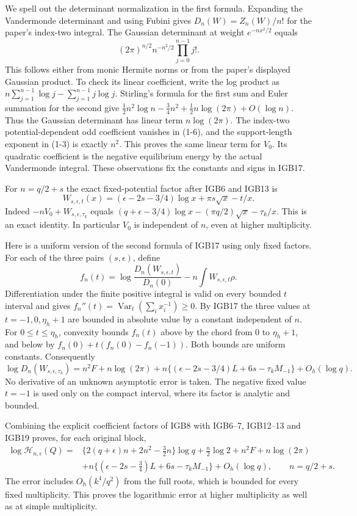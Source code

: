 We spell out the determinant normalization in the first formula.
Expanding the Vandermonde determinant and using Fubini gives
$D_n(W)=Z_n(W)/n!$ for the paper's index-two integral.
The Gaussian determinant at weight $e^{-nx^2/2}$ equals
\[
 (2\pi)^{n/2}n^{-n^2/2}\prod_{j=0}^{n-1}j!.
\]
This follows either from monic Hermite norms or from the paper's
displayed Gaussian product. To check its linear coefficient,
write the log product as
$n\sum_{j=1}^{n-1}\log j-\sum_{j=1}^{n-1}j\log j$.
Stirling's formula for the first sum and Euler summation for
the second give
$\tfrac12n^2\log n-\tfrac34n^2+
\tfrac12n\log(2\pi)+O(\log n)$.
Thus the Gaussian determinant has linear term $n\log(2\pi)$.
The index-two potential-dependent odd coefficient vanishes
in (1-6), and the support-length exponent in (1-3) is exactly
$n^2$. This proves the same linear term for $V_0$.
Its quadratic coefficient is the negative equilibrium energy
by the actual Vandermonde integral. These observations fix
the constants and signs in IGB17.

For $n=q/2+s$ the exact fixed-potential factor after IGB6 and
IGB13 is
\[
 W_{s,\epsilon,t}(x)=
 (\epsilon-2s-3/4)\log x+\pi s\sqrt{x}-t/x .
 \tag{IGB18}
\]
Indeed $-nV_0+W_{s,\epsilon,\tau_k}$ equals
$(q+\epsilon-3/4)\log x-(\pi q/2)\sqrt{x}-\tau_k/x$.
This is an exact identity. In particular $V_0$ is independent
of $n$, even at higher multiplicity.

Here is a uniform version of the second formula of IGB17 using only
fixed factors. For each of the three pairs $(s,\epsilon)$, define
\[
 f_n(t)=\log\frac{D_n(W_{s,\epsilon,t})}{D_n(0)}
                  -n\int W_{s,\epsilon,t}\rho .
\]
Differentiation under the finite positive integral is valid on
every bounded $t$ interval and gives
$f_n''(t)=\operatorname{Var}_t(\sum_i x_i^{-1})\geq0$.
By IGB17 the three values at $t=-1,0,\eta_h+1$ are bounded
in absolute value by a constant independent of $n$.
For $0\leq t\leq\eta_h$, convexity bounds $f_n(t)$ above by
the chord from $0$ to $\eta_h+1$, and below by
$f_n(0)+t(f_n(0)-f_n(-1))$.
Both bounds are uniform constants. Consequently
\[
 \log D_n(W_{s,\epsilon,\tau_k})
 =n^2F+n\log(2\pi)+
 n\{(\epsilon-2s-3/4)L+6s-\tau_kM_{-1}\}
 +O_h(\log q).
 \tag{IGB19}
\]
No derivative of an unknown asymptotic error is taken.
The negative fixed value $t=-1$ is used only on the compact
interval, where its factor is analytic and bounded.

Combining the explicit coefficient factors of IGB8 with
IGB6--7, IGB12--13 and IGB19 proves, for each original block,
\[
 \begin{aligned}
 \log\mathcal H_{n,\epsilon}(Q)
 ={}&\{2(q+\epsilon)n+2n^2-\tfrac32n\}\log q
       +\tfrac n2\log2+n^2F+n\log(2\pi)\\
 &+n\{(\epsilon-2s-\tfrac34)L+6s-\tau_kM_{-1}\}
       +O_h(\log q),\qquad n=q/2+s .
 \end{aligned}\tag{IGB20}
\]
The error includes $O_h(k^4/q^2)$ from the full roots, which is
bounded for every fixed multiplicity. This proves the logarithmic
error at higher multiplicity as well as at simple multiplicity.

